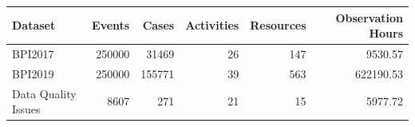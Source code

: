 \begin{tabular}{lrrrrr}
\toprule
Dataset & Events & Cases & Activities & Resources & Observation Hours \\
\midrule
BPI2017 & 250000 & 31469 & 26 & 147 & 9530.57 \\
BPI2019 & 250000 & 155771 & 39 & 563 & 622190.53 \\
Data Quality Issues & 8607 & 271 & 21 & 15 & 5977.72 \\
\bottomrule
\end{tabular}
